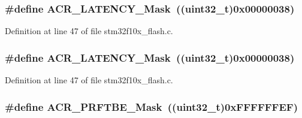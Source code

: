 \subsubsection[{\texorpdfstring{A\+C\+R\+\_\+\+L\+A\+T\+E\+N\+C\+Y\+\_\+\+Mask}{ACR_LATENCY_Mask}}]{\setlength{\rightskip}{0pt plus 5cm}\#define A\+C\+R\+\_\+\+L\+A\+T\+E\+N\+C\+Y\+\_\+\+Mask~(({\bf uint32\+\_\+t})0x00000038)}\hypertarget{group___f_l_a_s_h___private___defines_ga5f1112c5731f01b063fdf2461efbedf7}{}\label{group___f_l_a_s_h___private___defines_ga5f1112c5731f01b063fdf2461efbedf7}


Definition at line 47 of file stm32f10x\+\_\+flash.\+c.

\subsubsection[{\texorpdfstring{A\+C\+R\+\_\+\+L\+A\+T\+E\+N\+C\+Y\+\_\+\+Mask}{ACR_LATENCY_Mask}}]{\setlength{\rightskip}{0pt plus 5cm}\#define A\+C\+R\+\_\+\+L\+A\+T\+E\+N\+C\+Y\+\_\+\+Mask~(({\bf uint32\+\_\+t})0x00000038)}\hypertarget{group___f_l_a_s_h___private___defines_ga5f1112c5731f01b063fdf2461efbedf7}{}\label{group___f_l_a_s_h___private___defines_ga5f1112c5731f01b063fdf2461efbedf7}


Definition at line 47 of file stm32f10x\+\_\+flash.\+c.

\subsubsection[{\texorpdfstring{A\+C\+R\+\_\+\+P\+R\+F\+T\+B\+E\+\_\+\+Mask}{ACR_PRFTBE_Mask}}]{\setlength{\rightskip}{0pt plus 5cm}\#define A\+C\+R\+\_\+\+P\+R\+F\+T\+B\+E\+\_\+\+Mask~(({\bf uint32\+\_\+t})0x\+F\+F\+F\+F\+F\+F\+E\+F)}\hypertarget{group___f_l_a_s_h___private___defines_gaf95fa450690ce94c4f4357e4dd72791a}{}\label{group___f_l_a_s_h___private___defines_gaf95fa450690ce94c4f4357e4dd72791a}



